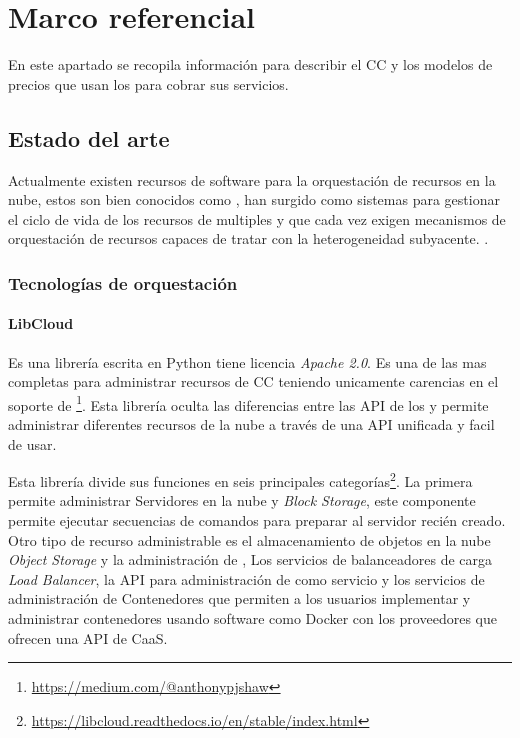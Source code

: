 
\chapter{Marco referencial} %

\label{ch:marcoReferencial} %
En este apartado se recopila información para describir el \acrshort{CC} y los modelos de precios que usan los  para cobrar sus servicios.\bigskip

\section{Estado del arte}
Actualmente existen recursos de software para la orquestación de recursos en la nube, estos son bien conocidos como , han surgido como sistemas para gestionar el ciclo de vida de los recursos de multiples  y que cada vez exigen mecanismos de orquestación de recursos capaces de tratar con la heterogeneidad subyacente. \cite{tomarchio2020cloud}.\bigskip

\subsection{Tecnologías de orquestación}

\subsubsection{LibCloud}
Es una librería escrita en Python tiene licencia \emph{Apache 2.0}. Es una de las mas completas para administrar recursos de \acrshort{CC} teniendo unicamente carencias en el soporte de  \footnote{\hyperref{https://medium.com/@anthonypjshaw/multi-cloud-what-are-the-options-part-1-low-level-abstraction-libraries-ce500f29120f}{}{}{https://medium.com/@anthonypjshaw}}. Esta librería oculta las diferencias entre las API de los  y permite administrar diferentes recursos de la nube a través de una \acrshort{API} unificada y facil de usar. \bigskip

Esta librería divide sus funciones en seis principales categorías\footnote{\url{https://libcloud.readthedocs.io/en/stable/index.html}}. La primera permite administrar Servidores en la nube y \emph{Block Storage}, este componente permite ejecutar secuencias de comandos para preparar al servidor recién creado. Otro tipo de recurso administrable es el almacenamiento de objetos en la nube \emph{Object Storage} y la administración de , Los servicios de balanceadores de carga \emph{Load Balancer}, la \acrshort{API} para administración de  como servicio y los servicios de administración de Contenedores que permiten a los usuarios implementar y administrar contenedores usando software como \gls{Docker} con los proveedores que ofrecen una \acrshort{API} de \acrshort{CaaS}.\bigskip

